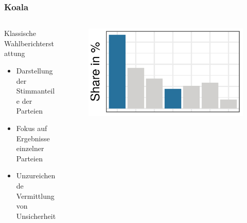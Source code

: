 \documentclass[aspectratio=169,xcolor=dvipsnames]{beamer}
\begin{document}
\begin{frame}
	\frametitle{Koala}
	\begin{columns}
		\begin{column}{0.6\textwidth}
			Klassische Wahlberichterstattung
			\begin{itemize}
				\item Darstellung der Stimmanteile der Parteien
				\item Fokus auf Ergebnisse einzelner Parteien
				\item Unzureichende Vermittlung von Unsicherheit			
			\end{itemize}
		\end{column}
		\begin{column}{0.4\textwidth}
			\begin{figure}
				\includegraphics[width=\textwidth]{partyshare}
			\end{figure}
		\end{column}
	\end{columns}
\end{frame}
\end{document}
